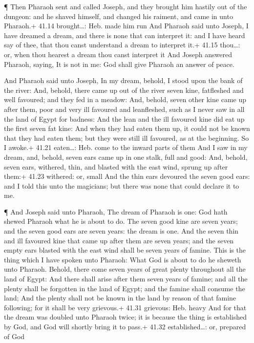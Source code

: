  ¶ Then Pharaoh sent and called Joseph, and they brought
him hastily out of the dungeon: and he shaved himself, and changed his
raiment, and came in unto Pharaoh.+ 41.14 brought\ldots: Heb. made him
run  And Pharaoh said unto Joseph, I have dreamed a dream,
and there is none that can interpret it: and I have heard say of thee,
that thou canst understand a dream to interpret it.+ 41.15 thou\ldots:
or, when thou hearest a dream thou canst interpret it  And
Joseph answered Pharaoh, saying, It is not in me: God shall give Pharaoh
an answer of peace.

 And Pharaoh said unto Joseph, In my dream, behold, I stood
upon the bank of the river:  And, behold, there came up out
of the river seven kine, fatfleshed and well favoured; and they fed in a
meadow:  And, behold, seven other kine came up after them,
poor and very ill favoured and leanfleshed, such as I never saw in all
the land of Egypt for badness:  And the lean and the ill
favoured kine did eat up the first seven fat kine:  And
when they had eaten them up, it could not be known that they had eaten
them; but they were still ill favoured, as at the beginning. So I
awoke.+ 41.21 eaten\ldots: Heb. come to the inward parts of them
 And I saw in my dream, and, behold, seven ears came up in
one stalk, full and good:  And, behold, seven ears,
withered, thin, and blasted with the east wind, sprung up after them:+
41.23 withered: or, small  And the thin ears devoured the
seven good ears: and I told this unto the magicians; but there was none
that could declare it to me.

 ¶ And Joseph said unto Pharaoh, The dream of Pharaoh is
one: God hath shewed Pharaoh what he is about to do.  The
seven good kine are seven years; and the seven good ears are seven
years: the dream is one.  And the seven thin and ill
favoured kine that came up after them are seven years; and the seven
empty ears blasted with the east wind shall be seven years of famine.
 This is the thing which I have spoken unto Pharaoh: What
God is about to do he sheweth unto Pharaoh.  Behold, there
come seven years of great plenty throughout all the land of Egypt:
 And there shall arise after them seven years of famine;
and all the plenty shall be forgotten in the land of Egypt; and the
famine shall consume the land;  And the plenty shall not be
known in the land by reason of that famine following; for it shall be
very grievous.+ 41.31 grievous: Heb. heavy  And for that
the dream was doubled unto Pharaoh twice; it is because the thing is
established by God, and God will shortly bring it to pass.+ 41.32
established\ldots: or, prepared of God

